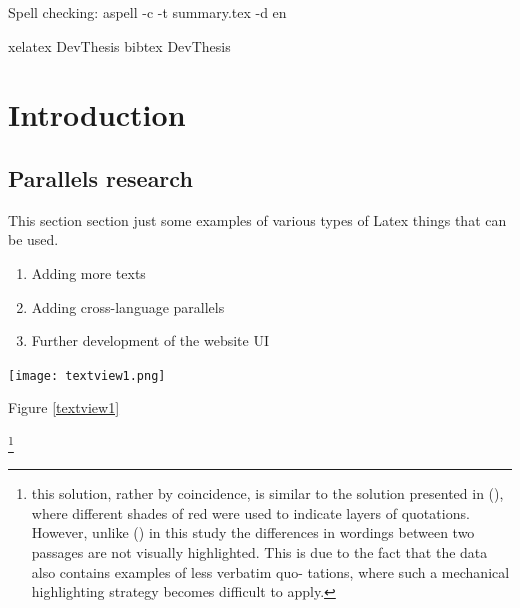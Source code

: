 Spell checking: aspell -c -t summary.tex -d en

xelatex DevThesis
bibtex DevThesis

\section{Introduction}
\subsection{Parallels research}

This section section just some examples of various types of Latex things that can be used.

\begin{enumerate}
 \item Adding more texts
 \item Adding cross-language parallels
 \item Further development of the website UI
\end{enumerate}

\newpage


\texttt{[image: textview1.png]}
\label{textview1}

\medskip
Figure \ref{textview1}

\footnote{this solution, rather by coincidence, is similar to the solution presented in (\cite{sturgeon2017}), where different shades of red were used to indicate layers of quotations. However, unlike (\cite{sturgeon2017}) in this study the differences in wordings between two passages are not visually highlighted. This is due to the fact that the data also contains examples of less verbatim quo-
tations, where such a mechanical highlighting strategy becomes difficult to apply.}


